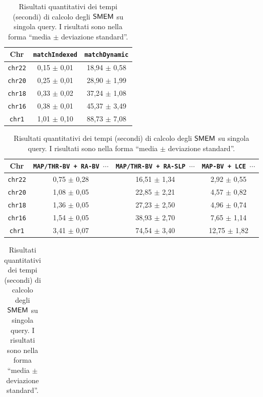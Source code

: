 \begin{table}
  \centering
  \caption{Risultati quantitativi dei tempi (secondi) di calcolo degli
    $\mbox{\rm {\sf SMEM}}$ su singola query. I risultati sono nella forma ``media $\pm$
    deviazione standard''.}  
  \label{tab:exetimesingle}
  \footnotesize
  \begin{tabular}{c||c|c} 
    \textbf{Chr}
    & \textbf{\texttt{matchIndexed}}
    & \textbf{\texttt{matchDynamic}}\\
    \hline
    \hline
    \texttt{chr22} & 0,15 $\pm$ 0,01 & 18,94 $\pm$ 0,58 \\
    \texttt{chr20} & 0,25 $\pm$ 0,01 & 28,90 $\pm$ 1,99 \\
    \texttt{chr18} & 0,33 $\pm$ 0,02 & 37,24 $\pm$ 1,08  \\
    \texttt{chr16} & 0,38 $\pm$ 0,01 & 45,37 $\pm$ 3,49 \\
    \texttt{chr1} & 1,01 $\pm$ 0,10 & 88,73 $\pm$ 7,08
  \end{tabular}
  \vspace{+3mm}
  \vspace{+1mm}
  \begin{tabular}{c||c|c|c} 
    \textbf{Chr}
    & \textbf{\texttt{MAP/THR-BV + RA-BV $\cdots$}}
    & \textbf{\texttt{MAP/THR-BV + RA-SLP $\cdots$}}
    & \textbf{\texttt{MAP-BV + LCE $\cdots$}}\\
    \hline
    \hline
    \texttt{chr22} & 0,75 $\pm$ 0,28 & 16,51 $\pm$ 1,34 & 2,92 $\pm$ 0,55\\
    \texttt{chr20} & 1,08 $\pm$ 0,05 & 22,85 $\pm$ 2,21 & 4,57 $\pm$ 0,82\\
    \texttt{chr18} & 1,36 $\pm$ 0,05 & 27,23 $\pm$ 2,50 & 4,96 $\pm$ 0,74 \\
    \texttt{chr16} & 1,54 $\pm$ 0,05 & 38,93 $\pm$ 2,70 & 7,65 $\pm$ 1,14 \\
    \texttt{chr1} & 3,41 $\pm$ 0,07 & 74,54 $\pm$ 3,40 & 12,75 $\pm$ 1,82 
  \end{tabular}
  \vspace{+3mm}
  \vspace{+1mm}
  \begin{tabular}{c||c|c|c} 

\end{tabular}
\end{table}
